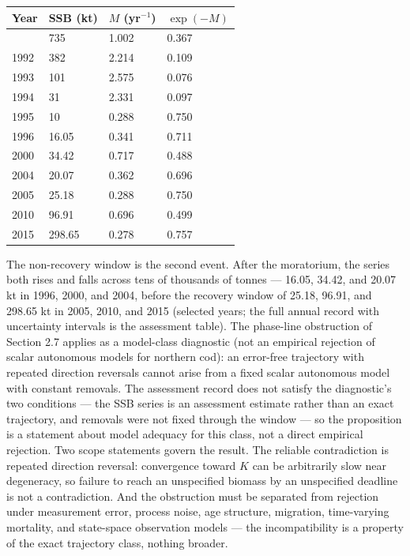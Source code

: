 \documentclass[11pt]{article}
\begin{document}
\begin{longtable}[]{@{}llll@{}}
\toprule\noalign{}
Year & SSB (kt) & \(M\) (yr\(^{-1}\)) & \(\exp(-M)\) \\
\midrule\noalign{}
\endhead
\bottomrule\noalign{}
\endlastfoot
1991 & 735 & 1.002 & 0.367 \\
1992 & 382 & 2.214 & 0.109 \\
1993 & 101 & 2.575 & 0.076 \\
1994 & 31 & 2.331 & 0.097 \\
1995 & 10 & 0.288 & 0.750 \\
1996 & 16.05 & 0.341 & 0.711 \\
2000 & 34.42 & 0.717 & 0.488 \\
2004 & 20.07 & 0.362 & 0.696 \\
2005 & 25.18 & 0.288 & 0.750 \\
2010 & 96.91 & 0.696 & 0.499 \\
2015 & 298.65 & 0.278 & 0.757 \\
\end{longtable}

The non-recovery window is the second event. After the moratorium, the
series both rises and falls across tens of thousands of tonnes ---
16.05, 34.42, and 20.07 kt in 1996, 2000, and 2004, before the recovery
window of 25.18, 96.91, and 298.65 kt in 2005, 2010, and 2015 (selected
years; the full annual record with uncertainty intervals is the
assessment table). The phase-line obstruction of Section 2.7 applies as
a model-class diagnostic (not an empirical rejection of scalar autonomous models for northern cod): an error-free trajectory with repeated
direction reversals cannot arise from a fixed scalar autonomous model
with constant removals. The assessment record does not satisfy the
diagnostic's two conditions --- the SSB series is an assessment estimate
rather than an exact trajectory, and removals were not fixed through the
window --- so the proposition is a statement about model adequacy for
this class, not a direct empirical rejection. Two scope statements
govern the result. The reliable contradiction is repeated direction
reversal: convergence toward \(K\) can be arbitrarily slow near
degeneracy, so failure to reach an unspecified biomass by an unspecified
deadline is not a contradiction. And the obstruction must be separated
from rejection under measurement error, process noise, age structure,
migration, time-varying mortality, and state-space observation models
--- the incompatibility is a property of the exact trajectory class,
nothing broader.
\end{document}
